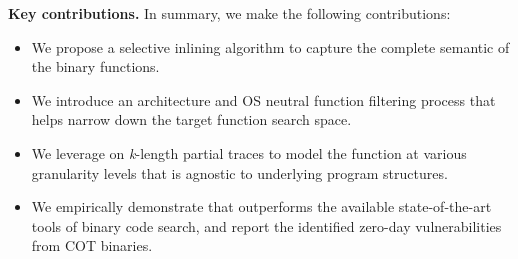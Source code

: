 \noindent\textbf{Key contributions.} In summary, we make the following contributions:
\begin{itemize}[nolistsep]
\itemsep0em
\item We propose a selective inlining algorithm to capture the complete semantic of the binary functions.
\item We introduce an architecture and OS neutral function filtering process that helps narrow down the target function search space.
\item We leverage on \emph{k}-length partial traces to model the function at various granularity levels that is agnostic to underlying program structures.
\item We empirically demonstrate that \tool outperforms the available state-of-the-art tools of binary code search, and report the identified zero-day vulnerabilities from COT binaries.%
\end{itemize}

